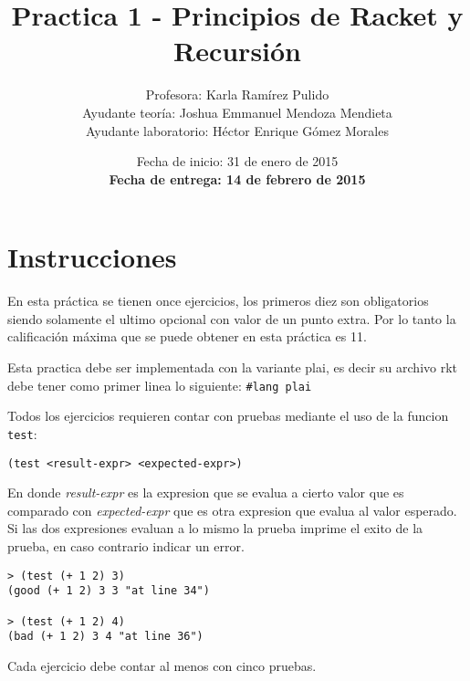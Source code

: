 \documentclass{article}
\author{Profesora: Karla Ramírez Pulido\\
  Ayudante teoría: Joshua Emmanuel Mendoza Mendieta\\
  Ayudante laboratorio: Héctor Enrique Gómez Morales}
\title{Practica 1 - Principios de Racket y Recursión}
\date{Fecha de inicio: 31 de enero de 2015\\
  \textbf{Fecha de entrega: 14 de febrero de 2015}}
\begin{document}
\maketitle
\section{Instrucciones}
En esta práctica se tienen once ejercicios, los primeros diez son
obligatorios siendo solamente el ultimo opcional con valor de un punto
extra. Por lo tanto la calificación máxima que se puede obtener en
esta práctica es 11.

Esta practica debe ser implementada con la variante plai, es decir
su archivo rkt debe tener como primer linea lo siguiente:
\texttt{\#lang plai}

Todos los ejercicios requieren contar con pruebas mediante el uso de
la funcion \texttt{test}:
\begin{verbatim}
(test <result-expr> <expected-expr>)
\end{verbatim}

En donde \textit{result-expr} es la expresion que se evalua a cierto
valor que es comparado con \textit{expected-expr} que es otra
expresion que evalua al valor esperado. Si las dos expresiones evaluan
a lo mismo la prueba imprime el exito de la prueba, en caso contrario
indicar un error.

\begin{verbatim}
> (test (+ 1 2) 3)
(good (+ 1 2) 3 3 "at line 34")

> (test (+ 1 2) 4)
(bad (+ 1 2) 3 4 "at line 36")
\end{verbatim}

Cada ejercicio debe contar al menos con cinco pruebas.
\end{document}
